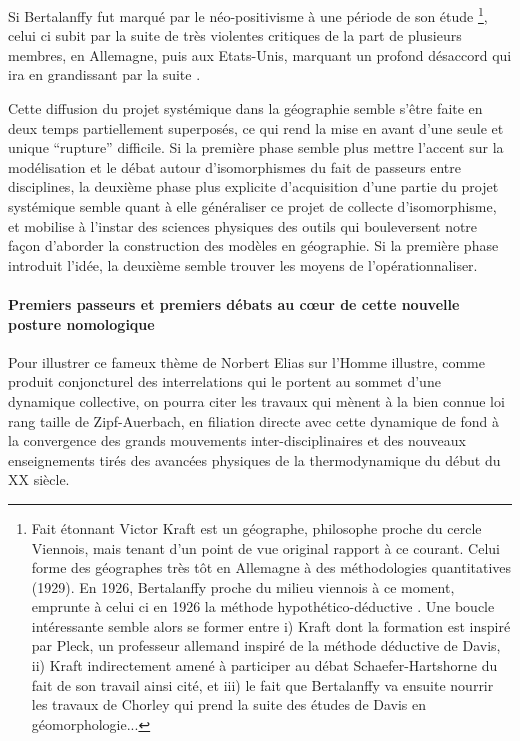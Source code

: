 Si Bertalanffy fut marqué par le néo-positivisme à une période de son étude \footnote{Fait étonnant Victor Kraft est un géographe, philosophe proche du cercle Viennois, mais tenant d'un point de vue original rapport à ce courant. Celui forme des géographes très tôt en Allemagne à des méthodologies quantitatives (1929). En 1926, Bertalanffy proche du milieu viennois à ce moment, emprunte à celui ci en 1926 la méthode hypothético-déductive \autocite[342]{Pouvreau2013}. Une boucle intéressante semble alors se former entre i) Kraft dont la formation est inspiré par Pleck, un professeur allemand inspiré de la méthode déductive de Davis, ii) Kraft indirectement amené à participer au débat Schaefer-Hartshorne du fait de son travail ainsi cité, et iii) le fait que Bertalanffy va ensuite nourrir les travaux de Chorley qui prend la suite des études de Davis en géomorphologie...}, celui ci subit par la suite de très violentes critiques de la part de plusieurs membres, en Allemagne, puis aux Etats-Unis, marquant un profond désaccord qui ira en grandissant par la suite \autocite[26-27]{Pouvreau2006}.

Cette diffusion du projet systémique dans la géographie semble s'être faite en deux temps partiellement superposés, ce qui rend la mise en avant d'une seule et unique \enquote{rupture} difficile. Si la première phase semble plus mettre l'accent sur la modélisation et le débat autour d'isomorphismes du fait de passeurs entre disciplines, la deuxième phase plus explicite d'acquisition d'une partie du projet systémique semble quant à elle généraliser ce projet de collecte d'isomorphisme, et mobilise à l'instar des sciences physiques des outils qui bouleversent notre façon d'aborder la construction des modèles en géographie. Si la première phase introduit l'idée, la deuxième semble trouver les moyens de l’opérationnaliser.

\paragraph{Premiers passeurs et premiers débats au cœur de cette nouvelle posture nomologique}

Pour illustrer ce fameux thème de Norbert Elias \autocite[31-33]{Delmotte2010} \textcite{Elias1991} sur l'Homme illustre, comme produit conjoncturel des interrelations qui le portent au sommet d'une dynamique collective, on pourra citer les travaux qui mènent à la bien connue loi rang taille de Zipf-Auerbach, en filiation directe avec cette dynamique de fond à la convergence des grands mouvements inter-disciplinaires et des nouveaux enseignements tirés des avancées physiques de la thermodynamique du début du XX siècle.

